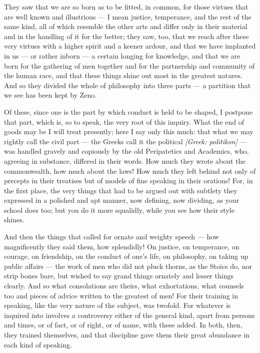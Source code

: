  They saw that we are so born as to be fitted, in common, for those virtues that are well known and illustrious — I mean justice, temperance, and the rest of the same kind, all of which resemble the other arts and differ only in their material and in the handling of it for the better; they saw, too, that we reach after these very virtues with a higher spirit and a keener ardour, and that we have implanted in us — or rather inborn — a certain longing for knowledge, and that we are born for the gathering of men together and for the partnership and community of the human race, and that these things shine out most in the greatest natures. And so they divided the whole of philosophy into three parts — a partition that we see has been kept by Zeno.

 Of these, since one is the part by which conduct is held to be shaped, I postpone that part, which is, so to speak, the very root of this inquiry. What the end of goods may be I will treat presently; here I say only this much: that what we may rightly call the civil part — the Greeks call it the political \textit{[Greek: politikon]} — was handled gravely and copiously by the old Peripatetics and Academics, who, agreeing in substance, differed in their words. How much they wrote about the commonwealth, how much about the laws! How much they left behind not only of precepts in their treatises but of models of fine speaking in their orations! For, in the first place, the very things that had to be argued out with subtlety they expressed in a polished and apt manner, now defining, now dividing, as your school does too; but you do it more squalidly, while you see how their style shines.

 And then the things that called for ornate and weighty speech — how magnificently they said them, how splendidly! On justice, on temperance, on courage, on friendship, on the conduct of one's life, on philosophy, on taking up public affairs — the work of men who did not pluck thorns, as the Stoics do, nor strip bones bare, but wished to say grand things ornately and lesser things clearly. And so what consolations are theirs, what exhortations, what counsels too and pieces of advice written to the greatest of men! For their training in speaking, like the very nature of the subject, was twofold. For whatever is inquired into involves a controversy either of the general kind, apart from persons and times, or of fact, or of right, or of name, with these added. In both, then, they trained themselves, and that discipline gave them their great abundance in each kind of speaking.


